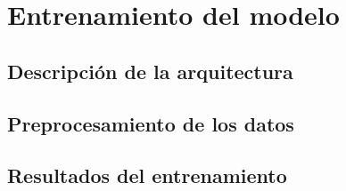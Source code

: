 \chapter{Entrenamiento del modelo}\label{ch:model_training}

\section{Descripción de la arquitectura}

\section{Preprocesamiento de los datos}

\section{Resultados del entrenamiento}